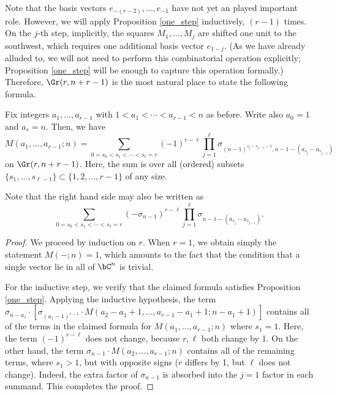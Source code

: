 Note that the basis vectors $e_{-(r-2)},\ldots,e_{-1}$ have not yet an played important role. However, we will apply Proposition \ref{one_step} inductively, $(r-1)$ times. On the $j$-th step, implicitly, the squares $M_1,\ldots,M_j$ are shifted one unit to the southwest, which requires one additional basis vector $e_{1-j}$. (As we have already alluded to, we will not need to perform this combinatorial operation explicitly; Proposition \ref{one_step} will be enough to capture this operation formally.) Therefore, $\Gr(r,n+r-1)$ is the most natural place to state the following formula.

\begin{coro}\label{explicit_M}
Fix integers $a_1,\ldots,a_{r-1}$ with $1<a_1<\cdots<a_{r-1}<n$ as before. Write also $a_0=1$ and $a_r=n$. Then, we have
\begin{equation*}
M(a_1,\ldots,a_{r-1};n)=\sum_{0=s_0<s_1<\cdots< s_\ell =r}(-1)^{r-\ell}\prod_{j=1}^{\ell}\sigma_{(n-1)^{s_j-s_{j-1}-1},n-1-(a_{s_j}-a_{s_{j-1}})}
\end{equation*}
on $\Gr(r,n+r-1)$. Here, the sum is over all (ordered) subsets $\{s_1,\ldots,s_{\ell-1}\}\subset\{1,2,\ldots,r-1\}$ of any size.
\end{coro}
Note that the right hand side may also be written as
\begin{equation*}
\sum_{0=s_0<s_1<\cdots< s_\ell =r}(-\sigma_{n-1})^{r-\ell}\prod_{j=1}^{\ell}\sigma_{n-1-(a_{s_j}-a_{s_{j-1}})}.
\end{equation*}
\begin{proof}
We proceed by induction on $r$. When $r=1$, we obtain simply the statement $M(-;n)=1$, which amounts to the fact that the condition that a single vector lie in all of $\bC^n$ is trivial.

For the inductive step, we verify that the claimed formula satisfies Proposition \ref{one_step}. Applying the inductive hypothesis, the term $\sigma_{n-a_1}\cdot [\sigma_{(a_1-1)^{r-1}}\cdot M(a_2-a_1+1,\ldots,a_{r-1}-a_1+1;n-a_1+1)]$ contains all of the terms in the claimed formula for $M(a_1,\ldots,a_{r-1};n)$ where $s_1=1$. Here, the term $(-1)^{r-\ell}$ does not change, because $r,\ell$ both change by 1. On the other hand, the term $\sigma_{n-1}\cdot M(a_2,\ldots,a_{r-1};n)$ contains all of the remaining terms, where $s_1>1$, but with opposite signs ($r$ differs by 1, but $\ell$ does not change). Indeed, the extra factor of $\sigma_{n-1}$ is absorbed into the $j=1$ factor in each summand. This completes the proof.
\end{proof}

